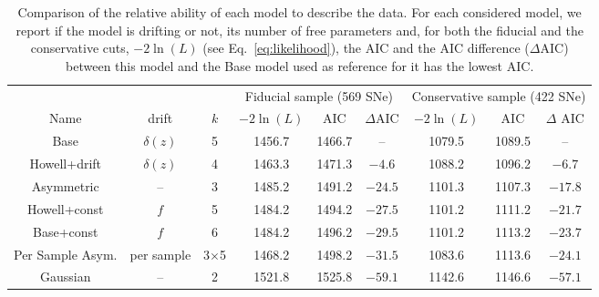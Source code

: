 \documentclass[]{aa} %
\begin{document}
\begin{table}
    \centering
    \caption{Comparison of the relative ability of each model to describe the
        data. For each considered model, we report if the model is drifting or
        not, its number of free parameters and, for both the fiducial and the
        conservative cuts, $-2\ln(L)$ (see
    Eq.~\ref{eq:likelihood}), the AIC and the AIC difference ($\Delta$AIC)
between this model and the Base model used as reference for it has the lowest
AIC.}
    \label{tab:comp}
    \begin{tabular}{ccc|ccc|ccc}
    \hline\hline
        & & & \multicolumn{3}{c}{Fiducial sample (569 SNe)}
            & \multicolumn{3}{|c}{Conservative sample (422 SNe)} \\
        Name & drift & $k$ &
        $-2\ln(L)$ & AIC & $\Delta$AIC & $-2\ln(L)$ & AIC & $\Delta$ AIC\\
        \hline

        Base & $\delta(z)$ & 5
        & 1456.7 & 1466.7 & -- 
        & 1079.5 & 1089.5 & -- \\

        Howell+drift & $\delta(z)$ & 4
        & 1463.3 & 1471.3 & $-4.6$
        & 1088.2 & 1096.2 & $-6.7$ 
        \\

        Asymmetric & -- & 3
        & 1485.2 & 1491.2 & $-24.5$
        & 1101.3 & 1107.3 & $-17.8$ 
        \\

        Howell+const & $f$ & 5
        & 1484.2 & 1494.2 & $-27.5$
        & 1101.2 & 1111.2 & $-21.7$ 
        \\

        Base+const & $f$ & 6
        & 1484.2 & 1496.2 & $-29.5$
        & 1101.2 & 1113.2 & $-23.7$ 
        \\

        Per Sample Asym. & per sample & 3$\times$5
        & 1468.2 & 1498.2 & $-31.5$
        & 1083.6 & 1113.6 & $-24.1$ 
        \\

        Gaussian & -- & 2
        & 1521.8 & 1525.8 & $-59.1$
        & 1142.6 & 1146.6 & $-57.1$ 
        \\
        \hline
    \end{tabular}
\end{table}
\end{document}
